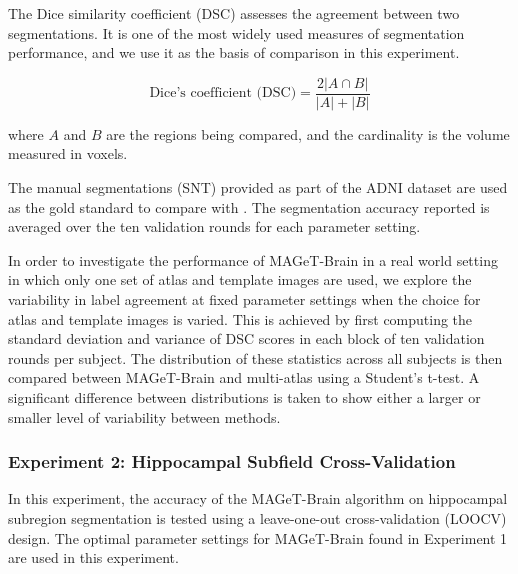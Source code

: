 \documentclass{article}\usepackage{graphicx, color}
\newcommand{\mb}{MAGeT-Brain }
\begin{document}
The Dice similarity coefficient (DSC) assesses the agreement between two
segmentations. It is one of the most widely used measures of segmentation
performance, and we use it as the basis of comparison in this experiment.

 \[\text{Dice's coefficient (DSC)} = \frac{2|A \cap B|}{|A| + |B|}\]


where $A$ and $B$ are the regions being compared, and the cardinality is the
volume measured in voxels. 

The manual segmentations (SNT) provided as part of the ADNI dataset are used as
the gold standard to compare with \citep{Hsu2002}.  The segmentation accuracy
reported is averaged over the ten validation rounds for each parameter setting.  

In order to investigate the performance of \mb in a real world setting in which 
only one set of atlas and template images are used, we explore the variability 
in label agreement at fixed parameter settings when the choice for atlas and 
template images is varied. This is achieved by first computing the standard 
deviation and variance of DSC scores in each block of ten validation rounds per
subject. The distribution of these statistics across all subjects is then
compared between \mb and multi-atlas using a Student's t-test. A significant
difference between distributions is taken to show either a larger or smaller
level of variability between methods. 

\subsubsection{Experiment 2: Hippocampal Subfield Cross-Validation}
In this experiment, the accuracy of the \mb algorithm on hippocampal subregion
segmentation is tested using a leave-one-out cross-validation (LOOCV) design. 
The optimal parameter settings for \mb found in Experiment 1 are used in this 
experiment.
\end{document}
